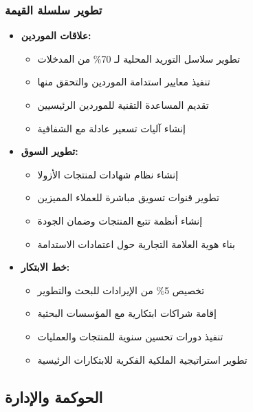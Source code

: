 \subsubsection{تطوير سلسلة القيمة}
\begin{itemize}
    \item \textbf{علاقات الموردين:}
    \begin{itemize}
        \item تطوير سلاسل التوريد المحلية لـ 70\% من المدخلات
        \item تنفيذ معايير استدامة الموردين والتحقق منها
        \item تقديم المساعدة التقنية للموردين الرئيسيين
        \item إنشاء آليات تسعير عادلة مع الشفافية
    \end{itemize}
    
    \item \textbf{تطوير السوق:}
    \begin{itemize}
        \item إنشاء نظام شهادات لمنتجات الأزولا
        \item تطوير قنوات تسويق مباشرة للعملاء المميزين
        \item إنشاء أنظمة تتبع المنتجات وضمان الجودة
        \item بناء هوية العلامة التجارية حول اعتمادات الاستدامة
    \end{itemize}
    
    \item \textbf{خط الابتكار:}
    \begin{itemize}
        \item تخصيص 5\% من الإيرادات للبحث والتطوير
        \item إقامة شراكات ابتكارية مع المؤسسات البحثية
        \item تنفيذ دورات تحسين سنوية للمنتجات والعمليات
        \item تطوير استراتيجية الملكية الفكرية للابتكارات الرئيسية
    \end{itemize}
\end{itemize}

\subsection{الحوكمة والإدارة}

